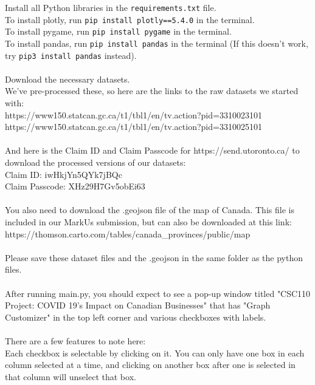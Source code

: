 \documentclass[fontsize=11pt]{article}
\begin{document}
    Install all Python libraries in the \texttt{requirements.txt} file.
    \\
    To install plotly, run \texttt{pip install plotly==5.4.0} in the terminal.
    \\
    To install pygame, run \texttt{pip install pygame} in the terminal.
    \\
    To install pandas, run \texttt{pip install pandas} in the terminal (If this doesn't work, try \texttt{pip3 install pandas} instead).
    \\
    \\
    Download the necessary datasets.
    \\
    We've pre-processed these, so here are the links to the raw datasets we started with:
    \\
    https://www150.statcan.gc.ca/t1/tbl1/en/tv.action?pid=3310023101
    \\
    https://www150.statcan.gc.ca/t1/tbl1/en/tv.action?pid=3310025101
    \\
    \\
    And here is the Claim ID and Claim Passcode for https://send.utoronto.ca/ to download the processed versions of our datasets:
    \\
    Claim ID: iwHkjYn5QYk7jBQc
    \\
    Claim Passcode: XHz29H7Gv5obEi63
    \\
    \\
    You also need to download the .geojson file of the map of Canada. This file is included in our MarkUs submission, but can also be downloaded at this link:
    \\
    https://thomson.carto.com/tables/canada\_provinces/public/map
    \\
    \\
    Please save these dataset files and the .geojson in the same folder as the python files.
    \\
    \\
    After running main.py, you should expect to see a pop-up window titled "CSC110 Project: COVID 19's Impact on Canadian Businesses" that has "Graph Customizer" in the top left corner and various checkboxes with labels.
    \\
    \\
    There are a few features to note here:
    \\
    Each checkbox is selectable by clicking on it. You can only have one box in each column selected at a time, and clicking on another box after one is selected in that column will unselect that box.
\end{document}

